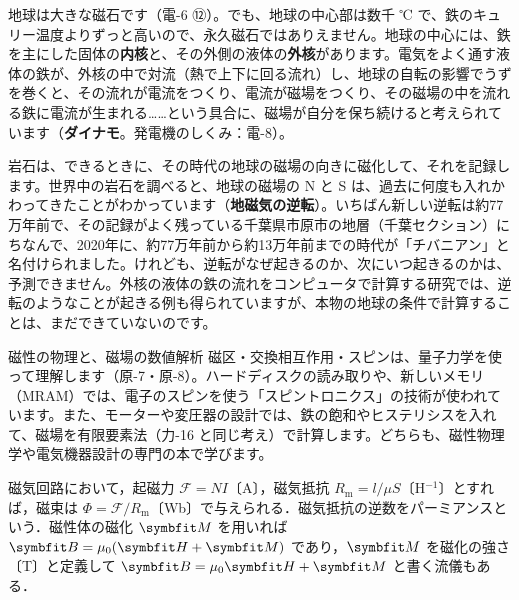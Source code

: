 \label{ph:電-7:sec11}
地球は大きな磁石です（電-6 ⑫）。でも、地球の中心部は数千 ℃ で、鉄のキュリー温度よりずっと高いので、永久磁石ではありえません。地球の中心には、鉄を主にした固体の\textbf{内核}と、その外側の液体の\textbf{外核}があります。電気をよく通す液体の鉄が、外核の中で対流（熱で上下に回る流れ）し、地球の自転の影響でうずを巻くと、その流れが電流をつくり、電流が磁場をつくり、その磁場の中を流れる鉄に電流が生まれる……という具合に、磁場が自分を保ち続けると考えられています（\textbf{ダイナモ}。発電機のしくみ：電-8）。

\begin{phmada}
岩石は、できるときに、その時代の地球の磁場の向きに磁化して、それを記録します。世界中の岩石を調べると、地球の磁場の N と S は、過去に何度も入れかわってきたことがわかっています（\textbf{地磁気の逆転}）。いちばん新しい逆転は約77万年前で、その記録がよく残っている千葉県市原市の地層（千葉セクション）にちなんで、2020年に、約77万年前から約13万年前までの時代が「チバニアン」と名付けられました。けれども、逆転がなぜ起きるのか、次にいつ起きるのかは、予測できません。外核の液体の鉄の流れをコンピュータで計算する研究では、逆転のようなことが起きる例も得られていますが、本物の地球の条件で計算することは、まだできていないのです。
\end{phmada}

\begin{phsaki}{磁性の物理と、磁場の数値解析}
磁区・交換相互作用・スピンは、量子力学を使って理解します（原-7・原-8）。ハードディスクの読み取りや、新しいメモリ（MRAM）では、電子のスピンを使う「スピントロニクス」の技術が使われています。また、モーターや変圧器の設計では、鉄の飽和やヒステリシスを入れて、磁場を有限要素法（力-16 と同じ考え）で計算します。どちらも、磁性物理学や電気機器設計の専門の本で学びます。
\end{phsaki}

\begin{senmonsho}
\begin{bkhonbun}
磁気回路において，起磁力 $\mathcal F=NI$〔A〕，磁気抵抗 $R_{\mathrm m}=l/\mu S$〔H$^{-1}$〕とすれば，磁束は $\Phi=\mathcal F/R_{\mathrm m}$〔Wb〕で与えられる．磁気抵抗の逆数をパーミアンスという．磁性体の磁化 $\symbfit M$ を用いれば $\symbfit B=\mu_0(\symbfit H+\symbfit M)$ であり，$\symbfit M$ を磁化の強さ〔T〕と定義して $\symbfit B=\mu_0\symbfit H+\symbfit M$ と書く流儀もある．
\end{bkhonbun}
\end{senmonsho}

